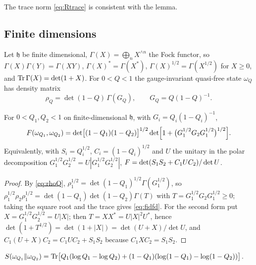 The trace norm \eqref{eq:Rtrace} is consistent with the lemma.

\subsection{Finite dimensions}
Let $\mathfrak h$ be finite dimensional, $\Gamma(X)=\bigoplus_nX^{\wedge n}$ the
Fock functor, so $\Gamma(X)\Gamma(Y)=\Gamma(XY)$, $\Gamma(X)^*=\Gamma(X^*)$,
$\Gamma(X)^{1/2}=\Gamma(X^{1/2})$ for $X\ge0$, and $\operatorname{Tr}\Gamma(X)=\det(1+X)$.  For
$0<Q<1$ the gauge-invariant quasi-free state $\omega_Q$ has density matrix
\begin{equation}\label{eq:rhoQ}
 \rho_Q=\det(1-Q)\,\Gamma(G_Q),\qquad G_Q=Q(1-Q)^{-1}.
\end{equation}

\begin{theorem}\label{thm:fidfd}
For $0<Q_1,Q_2<1$ on finite-dimensional $\mathfrak h$, with $G_i=Q_i(1-Q_i)^{-1}$,
\begin{equation}\label{eq:fidfd}
 F(\omega_{Q_1},\omega_{Q_2})
 =\det\bigl[(1-Q_1)(1-Q_2)\bigr]^{1/2}
 \det\Bigl[1+\bigl(G_1^{1/2}G_2G_1^{1/2}\bigr)^{1/2}\Bigr].
\end{equation}
Equivalently, with $S_i=Q_i^{1/2}$, $C_i=(1-Q_i)^{1/2}$ and $U$ the unitary in the
polar decomposition $G_1^{1/2}G_2^{1/2}=U|G_1^{1/2}G_2^{1/2}|$,
$F=\det(S_1S_2+C_1UC_2)/\det U$.
\end{theorem}

\begin{proof}
By \eqref{eq:rhoQ}, $\rho_1^{1/2}=\det(1-Q_1)^{1/2}\Gamma(G_1^{1/2})$, so
$\rho_1^{1/2}\rho_2\rho_1^{1/2}=\det(1-Q_1)\det(1-Q_2)\Gamma(T)$ with
$T=G_1^{1/2}G_2G_1^{1/2}\ge0$; taking the square root and the trace gives
\eqref{eq:fidfd}.  For the second form put $X=G_1^{1/2}G_2^{1/2}=U|X|$; then
$T=XX^*=U|X|^2U^*$, hence
$\det(1+T^{1/2})=\det(1+|X|)=\det(U+X)/\det U$, and
$C_1(U+X)C_2=C_1UC_2+S_1S_2$ because $C_1XC_2=S_1S_2$.
\end{proof}

\begin{proposition}\label{prop:relentfd}
$S(\omega_{Q_1}\Vert\omega_{Q_2})=\operatorname{Tr}\bigl[Q_1(\log Q_1-\log Q_2)
+(1-Q_1)(\log(1-Q_1)-\log(1-Q_2))\bigr]$.
\end{proposition}

